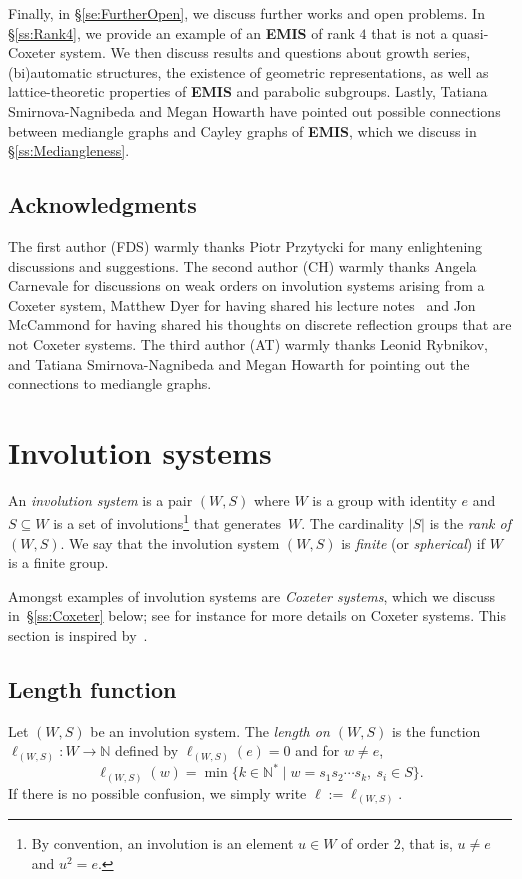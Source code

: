 \documentclass[A4paper, oneside]{amsart}
\newcommand{\id}{\textit{e}}
\newcommand{\EMIS}{\textnormal{\bf EMIS}\xspace}
\theoremstyle{definition}
\begin{document}
  Finally, in \S\ref{se:FurtherOpen}, we discuss further works and open problems.  In \S\ref{ss:Rank4}, we provide an example of an \EMIS of rank $4$ that is not a quasi-Coxeter system. We then discuss results and questions about growth series, (bi)automatic structures, the existence of geometric representations, as well as lattice-theoretic properties of \EMIS and parabolic subgroups. Lastly, Tatiana Smirnova-Nagnibeda and Megan Howarth have pointed out possible connections between mediangle graphs \cite{genevois2022rotation} and Cayley graphs of \EMIS, which we discuss in \S\ref{ss:Mediangleness}. 



\subsection*{Acknowledgments} The first  author (FDS) warmly thanks  Piotr Przytycki for many enlightening discussions and suggestions. The second author (CH) warmly thanks Angela Carnevale for discussions on weak orders on involution systems arising from a Coxeter system, Matthew Dyer for having shared his lecture notes~\cite{DyLectures} and Jon McCammond for having shared his thoughts on discrete reflection groups that are not Coxeter systems. The third author (AT) warmly thanks Leonid Rybnikov, and Tatiana Smirnova-Nagnibeda and Megan Howarth for pointing out the connections to mediangle graphs.


\section{Involution systems}
\label{se:IS}

An {\em involution system} is a pair $(W,S)$ where $W$ is a group with identity $\id$ and $S\subseteq W$ is a set of involutions\footnote{By convention, an involution is an element $u\in W$ of order $2$, that is, $u\not =e$ and $u^2=\id$.} that generates~$W$. The cardinality $|S|$ is the {\em rank of $(W,S)$}. We say that the involution system $(W,S)$ is  {\em finite} (or {\em spherical}) if $W$ is a finite group. 

Amongst examples of involution systems are {\em Coxeter systems}, which we discuss in~\S\ref{ss:Coxeter} below; see for instance \cite{Hu90,BjBr05,AbBr08} for more details on Coxeter systems. This section is inspired by~\cite{DyLectures}.


\subsection{Length function} Let $(W,S)$ be an involution system. The \emph{length on $(W,S)$} is the function  $\ell_{(W,S)}: W \to \mathbb{N}$ defined by $\ell_{(W,S)}(\id)=0$ and for $w\not = \id$,
$$
 \ell_{(W,S)}(w)= \min\{k \in \mathbb{N}^* \mid w=s_1s_2\cdots s_k, \ s_i \in S\}.
$$
If there is no possible confusion, we simply write $\ell:=\ell_{(W,S)}$.
\end{document}
